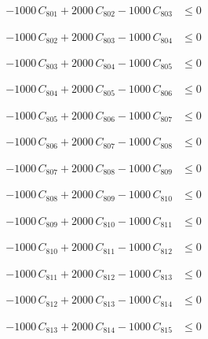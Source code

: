 \documentclass[a4paper,11pt]{article}
\begin{document}
\begin{align}
-1000\,C_{801} + 2000\,C_{802} - 1000\,C_{803} &\leq 0 \nonumber
\end{align}

\begin{align}
-1000\,C_{802} + 2000\,C_{803} - 1000\,C_{804} &\leq 0 \nonumber
\end{align}

\begin{align}
-1000\,C_{803} + 2000\,C_{804} - 1000\,C_{805} &\leq 0 \nonumber
\end{align}

\begin{align}
-1000\,C_{804} + 2000\,C_{805} - 1000\,C_{806} &\leq 0 \nonumber
\end{align}

\begin{align}
-1000\,C_{805} + 2000\,C_{806} - 1000\,C_{807} &\leq 0 \nonumber
\end{align}

\begin{align}
-1000\,C_{806} + 2000\,C_{807} - 1000\,C_{808} &\leq 0 \nonumber
\end{align}

\begin{align}
-1000\,C_{807} + 2000\,C_{808} - 1000\,C_{809} &\leq 0 \nonumber
\end{align}

\begin{align}
-1000\,C_{808} + 2000\,C_{809} - 1000\,C_{810} &\leq 0 \nonumber
\end{align}

\begin{align}
-1000\,C_{809} + 2000\,C_{810} - 1000\,C_{811} &\leq 0 \nonumber
\end{align}

\begin{align}
-1000\,C_{810} + 2000\,C_{811} - 1000\,C_{812} &\leq 0 \nonumber
\end{align}

\begin{align}
-1000\,C_{811} + 2000\,C_{812} - 1000\,C_{813} &\leq 0 \nonumber
\end{align}

\begin{align}
-1000\,C_{812} + 2000\,C_{813} - 1000\,C_{814} &\leq 0 \nonumber
\end{align}

\begin{align}
-1000\,C_{813} + 2000\,C_{814} - 1000\,C_{815} &\leq 0 \nonumber
\end{align}
\end{document}
